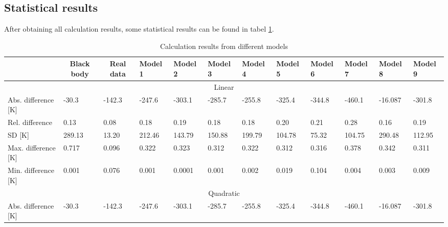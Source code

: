 \subsection{Statistical results}

After obtaining all calculation results, some statistical results can be found in 
tabel \ref{tab: statistic_results}. 

\begin{table}
    \centering
    \caption{Calculation results from different models}
    \label{tab: statistic_results}
    \begin{tabular}{llllllllllll}
        \hline
        & \multicolumn{1}{c}{Black body} & \multicolumn{1}{c}{Real data} & Model 1 & Model 2 & Model 3 & Model 4 & Model 5 & Model 6 & Model 7 & Model 8 & Model 9 \\ \hline
        \multicolumn{12}{c}{Linear}                                                                                                                                                        \\ \hline
        Abs. difference {[}K{]} & -30.3                          & -142.3                        & -247.6  & -303.1  & -285.7  & -255.8  & -325.4  & -344.8  & -460.1  & -16.087 & -301.8  \\
        Rel. difference         & 0.13                           & 0.08                          & 0.18    & 0.19    & 0.18    & 0.18    & 0.20    & 0.21    & 0.28    & 0.16    & 0.19    \\
        SD {[}K{]}              & 289.13                         & 13.20                         & 212.46  & 143.79  & 150.88  & 199.79  & 104.78  & 75.32   & 104.75  & 290.48  & 112.95  \\
        Max. difference {[}K{]} & 0.717                          & 0.096                         & 0.322   & 0.323   & 0.312   & 0.322   & 0.312   & 0.316   & 0.378   & 0.342   & 0.311   \\
        Min. difference {[}K{]} & 0.001                          & 0.076                         & 0.001   & 0.0001  & 0.001   & 0.002   & 0.019   & 0.104   & 0.004   & 0.003   & 0.009   \\ \hline
        \multicolumn{12}{c}{Quadratic}                                                                                                                                                     \\ \hline
        Abs. difference {[}K{]} & -30.3                          & -142.3                        & -247.6  & -303.1  & -285.7  & -255.8  & -325.4  & -344.8  & -460.1  & -16.087 & -301.8  \\

\end{tabular}
\end{table}
